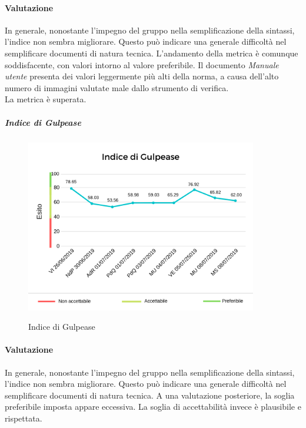 	\paragraph*{Valutazione} In generale, nonostante l'impegno del gruppo nella semplificazione della sintassi, l'indice non sembra migliorare. Questo può  indicare una generale difficoltà nel semplificare documenti di natura tecnica. L'andamento della metrica è comunque soddisfacente, con valori intorno al valore preferibile. 
	Il documento \textit{Manuale utente} presenta dei valori leggermente più alti della norma, a causa dell'alto numero di immagini valutate male dallo strumento di verifica. 
	 \\
	La metrica è superata.
	\pagebreak
	\subparagraph{Indice di Gulpease}
	\begin{center}
		\begin{figure}[h] 
			\centering 
			\includegraphics[width=0.90\textwidth]{res/images/new/gulpease.png}\\
			\caption{Indice di Gulpease}
		\end{figure}
	\end{center}
	\paragraph*{Valutazione} In generale, nonostante l'impegno del gruppo nella semplificazione della sintassi, l'indice non sembra migliorare. Questo può  indicare una generale difficoltà nel semplificare documenti di natura tecnica.
	A una valutazione posteriore, la soglia preferibile imposta appare eccessiva. La soglia di accettabilità invece è plausibile e rispettata.
	\pagebreak
	
